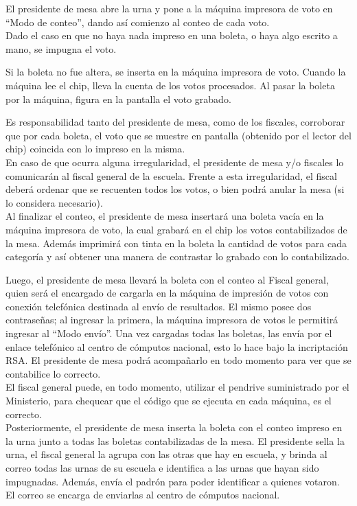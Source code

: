 El presidente de mesa abre la urna y pone a la máquina impresora de voto en “Modo de conteo”, dando así comienzo al conteo de cada voto. \\

Dado el caso en que no haya nada impreso en una boleta, o haya algo escrito a mano, se impugna el voto.

Si la boleta no fue altera, se inserta en la m\'aquina impresora de voto. Cuando la máquina lee el chip, lleva la cuenta de los votos procesados. Al pasar la boleta por la máquina, figura en la pantalla el voto grabado. 

Es responsabilidad tanto del presidente de mesa, como de los fiscales, corroborar que por cada boleta, el voto que se muestre en pantalla (obtenido por el lector del chip) coincida con lo impreso en la misma.\\

En caso de que ocurra alguna irregularidad, el presidente de mesa y/o fiscales lo comunicarán al fiscal general de la escuela. Frente a esta irregularidad, el fiscal deber\'a ordenar que se recuenten todos los votos, o bien podrá anular la mesa (si lo considera necesario).\\

Al finalizar el conteo, el presidente de mesa insertará una boleta vacía en la máquina impresora de voto, la cual grabará en el chip los votos contabilizados de la mesa. Además imprimirá con tinta en la boleta la cantidad de votos para cada categoría y así obtener una manera de contrastar lo grabado con lo contabilizado.

Luego, el presidente de mesa llevará la boleta con el conteo al Fiscal general, quien será el encargado de cargarla en la máquina de impresión de votos con conexión telefónica destinada al envío de resultados. El mismo posee dos contraseñas; al ingresar la primera, la máquina impresora de votos le permitirá ingresar al “Modo envío”. Una vez cargadas todas las boletas, las envía por el enlace telefónico al centro de cómputos nacional, esto lo hace bajo la incriptaci\'on RSA. El presidente de mesa podrá acompañarlo en todo momento para ver que se contabilice lo correcto.\\

El fiscal general puede, en todo momento, utilizar el pendrive suministrado por el Ministerio, para chequear que el código que se ejecuta en cada máquina, es el correcto.\\

Posteriormente, el presidente de mesa inserta la boleta con el conteo impreso en la urna junto a todas las boletas contabilizadas de la mesa. El presidente sella la urna, el fiscal general la agrupa con las otras que hay en escuela, y brinda al correo todas las urnas de su escuela e identifica a las urnas que hayan sido impugnadas. Además, envía el padrón para poder identificar a quienes votaron. El correo se encarga de enviarlas al centro de cómputos nacional.\\


